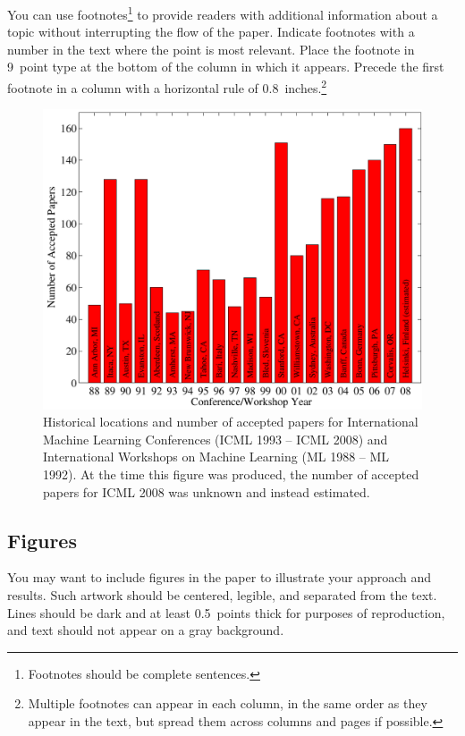 \documentclass[nohyperref]{article}
\theoremstyle{plain}
\theoremstyle{definition}
\theoremstyle{remark}
\begin{document}
You can use footnotes\footnote{Footnotes
should be complete sentences.} to provide readers with additional
information about a topic without interrupting the flow of the paper.
Indicate footnotes with a number in the text where the point is most
relevant. Place the footnote in 9~point type at the bottom of the
column in which it appears. Precede the first footnote in a column
with a horizontal rule of 0.8~inches.\footnote{Multiple footnotes can
appear in each column, in the same order as they appear in the text,
but spread them across columns and pages if possible.}

\begin{figure}[ht]
\vskip 0.2in
\begin{center}
\centerline{\includegraphics[width=\columnwidth]{icml_numpapers}}
\caption{Historical locations and number of accepted papers for International
Machine Learning Conferences (ICML 1993 -- ICML 2008) and International
Workshops on Machine Learning (ML 1988 -- ML 1992). At the time this figure was
produced, the number of accepted papers for ICML 2008 was unknown and instead
estimated.}
\label{icml-historical}
\end{center}
\vskip -0.2in
\end{figure}

\subsection{Figures}

You may want to include figures in the paper to illustrate
your approach and results. Such artwork should be centered,
legible, and separated from the text. Lines should be dark and at
least 0.5~points thick for purposes of reproduction, and text should
not appear on a gray background.
\end{document}
